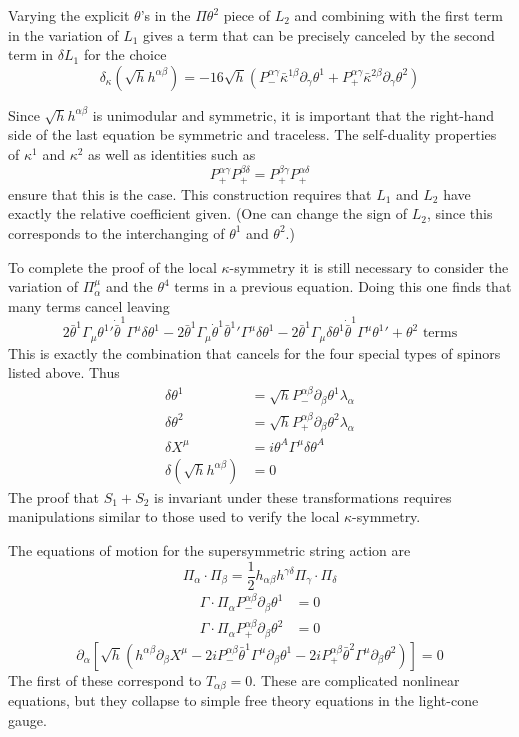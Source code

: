\documentclass[a4paper,12pt]{article}
\numberwithin{equation}{section}
\numberwithin{thm}{section}
\numberwithin{exm}{section}
\newcommand{\p}{\partial}
\newcommand{\<}{{\langle}}
\renewcommand{\>}{{\rangle}}
\renewcommand{\a}{{\alpha}}
\renewcommand{\b}{{\beta}}
\renewcommand{\d}{{\delta}}
\newcommand{\g}{{\gamma}}
\newcommand{\G}{{\Gamma}}
\renewcommand{\k}{{\kappa}}
\newcommand{\kb}{{\bar\kappa}}
\renewcommand{\l}{{\lambda}}
\newcommand{\m}{{\mu}}
\renewcommand{\t}{{\theta}}
\newcommand{\tb}{{\bar\theta}}
\begin{document}
Varying the explicit $\t$'s in the $\Pi\t^2$ piece of $L_2$ and combining with the first term in the variation of $L_1$ gives a term that can be precisely canceled by the second term in $\d L_1$ for the choice
	\begin{equation}
	\d_\k (\sqrt h h^{\a\b}) = -16 \sqrt h (P^{\a\g}_-\kb^{1\b}\p_\g\t^1 + P^{\a\g}_+\kb^{2\b}\p_\g\t^2)
	\end{equation}

Since $\sqrt h h^{\a\b}$ is unimodular and symmetric, it is important that the right-hand side of the last equation be symmetric and traceless. The self-duality properties of $\k^1$ and $\k^2$ as well as identities such as
	\begin{equation}
	P^{\a\g}_+ P^{\b\d}_+ = P^{\b\g}_+ P^{\a\d}_+
	\end{equation}
ensure that this is the case. This construction requires that $L_1$ and $L_2$ have exactly the relative coefficient given. (One can change the sign of $L_2$, since this corresponds to the interchanging of $\t^1$ and $\t^2$.)

To complete the proof of the local $\k$-symmetry it is still necessary to consider the variation of $\Pi^\m_\a$ and the $\t^4$ terms in a previous equation. Doing this one finds that many terms cancel leaving
	\begin{equation}
	2\tb^1\G_\m\t^1{}'\dot\tb^1\G^\m\d\t^1 - 2\tb^1\G_\m\dot\t^1\tb^1{}' \G^\m\d\t^1 - 2\tb^1\G_\m\d\t^1\dot\tb^1\G^\m\t^1{}'  + \t^2\text{ terms}
	\end{equation}
This is exactly the combination that cancels for the four special types of spinors listed above. Thus 
	\begin{align}
	\d\t^1 & = \sqrt h P^{\a\b}_-\p_\b\t^1\l_\a \\
	\d\t^2 & = \sqrt h P^{\a\b}_+\p_\b\t^2\l_\a \\
	\d X^\m & = i\t^A\G^\m\d\t^A \\
	\d(\sqrt h h^{\a\b}) & = 0
	\end{align}
The proof that $S_1 + S_2$ is invariant under these transformations requires manipulations similar to those used to verify the local $\k$-symmetry.

The equations of motion for the supersymmetric string action are
	\begin{equation}
	\Pi_\a\cdot\Pi_\b = \frac{1}{2}h_{\a\b} h^{\g\d} \Pi_\g\cdot\Pi_\d
	\end{equation}
	\begin{align}
	\G\cdot\Pi_\a P^{\a\b}_-\p_\b\t^1 & = 0 \\
	\G\cdot\Pi_\a P^{\a\b}_+\p_\b\t^2 & = 0
	\end{align}
	\begin{equation}
	\p_\a[\sqrt h(h^{\a\b}\p_\b X^\m - 2iP^{\a\b}_-\tb^1\G^\m\p_\b\t^1 - 2i P^{\a\b}_+\tb^2\G^\m\p_\b\t^2)] = 0
	\end{equation}
The first of these correspond to $T_{\a\b} = 0$. These are complicated nonlinear equations, but they collapse to simple free theory equations in the light-cone gauge.
\end{document}
